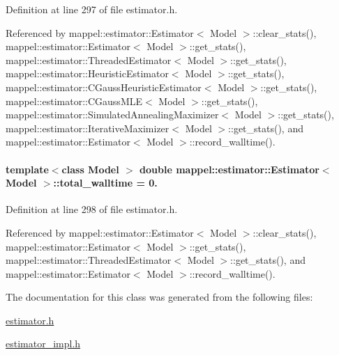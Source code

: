 Definition at line 297 of file estimator.\+h.



Referenced by mappel\+::estimator\+::\+Estimator$<$ Model $>$\+::clear\+\_\+stats(), mappel\+::estimator\+::\+Estimator$<$ Model $>$\+::get\+\_\+stats(), mappel\+::estimator\+::\+Threaded\+Estimator$<$ Model $>$\+::get\+\_\+stats(), mappel\+::estimator\+::\+Heuristic\+Estimator$<$ Model $>$\+::get\+\_\+stats(), mappel\+::estimator\+::\+C\+Gauss\+Heuristic\+Estimator$<$ Model $>$\+::get\+\_\+stats(), mappel\+::estimator\+::\+C\+Gauss\+M\+L\+E$<$ Model $>$\+::get\+\_\+stats(), mappel\+::estimator\+::\+Simulated\+Annealing\+Maximizer$<$ Model $>$\+::get\+\_\+stats(), mappel\+::estimator\+::\+Iterative\+Maximizer$<$ Model $>$\+::get\+\_\+stats(), and mappel\+::estimator\+::\+Estimator$<$ Model $>$\+::record\+\_\+walltime().

\paragraph[{\texorpdfstring{total\+\_\+walltime}{total_walltime}}]{\setlength{\rightskip}{0pt plus 5cm}template$<$class Model $>$ double {\bf mappel\+::estimator\+::\+Estimator}$<$ Model $>$\+::total\+\_\+walltime = 0.\hspace{0.3cm}{\ttfamily [protected]}}\hypertarget{classmappel_1_1estimator_1_1Estimator_a98ad459e850aeb2c42c10fd06c3b9fbc}{}\label{classmappel_1_1estimator_1_1Estimator_a98ad459e850aeb2c42c10fd06c3b9fbc}


Definition at line 298 of file estimator.\+h.



Referenced by mappel\+::estimator\+::\+Estimator$<$ Model $>$\+::clear\+\_\+stats(), mappel\+::estimator\+::\+Estimator$<$ Model $>$\+::get\+\_\+stats(), mappel\+::estimator\+::\+Threaded\+Estimator$<$ Model $>$\+::get\+\_\+stats(), and mappel\+::estimator\+::\+Estimator$<$ Model $>$\+::record\+\_\+walltime().



The documentation for this class was generated from the following files\+:\begin{DoxyCompactItemize}
\item 
\hyperlink{estimator_8h}{estimator.\+h}\item 
\hyperlink{estimator__impl_8h}{estimator\+\_\+impl.\+h}\end{DoxyCompactItemize}
